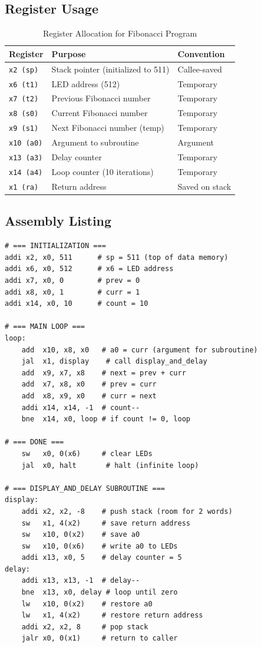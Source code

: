 \documentclass[12pt,a4paper]{article}
\begin{document}
\subsection{Register Usage}
\begin{table}[h]
\centering
\caption{Register Allocation for Fibonacci Program}
\begin{tabular}{@{}lll@{}}
\toprule
\textbf{Register} & \textbf{Purpose} & \textbf{Convention} \\
\midrule
\texttt{x2 (sp)}  & Stack pointer (initialized to 511) & Callee-saved \\
\texttt{x6 (t1)}  & LED address (512)                  & Temporary \\
\texttt{x7 (t2)}  & Previous Fibonacci number          & Temporary \\
\texttt{x8 (s0)}  & Current Fibonacci number           & Temporary \\
\texttt{x9 (s1)}  & Next Fibonacci number (temp)       & Temporary \\
\texttt{x10 (a0)} & Argument to subroutine             & Argument \\
\texttt{x13 (a3)} & Delay counter                      & Temporary \\
\texttt{x14 (a4)} & Loop counter (10 iterations)       & Temporary \\
\texttt{x1 (ra)}  & Return address                     & Saved on stack \\
\bottomrule
\end{tabular}
\end{table}

\subsection{Assembly Listing}
\begin{lstlisting}[style=asm, caption={Fibonacci Program}]
# === INITIALIZATION ===
addi x2, x0, 511      # sp = 511 (top of data memory)
addi x6, x0, 512      # x6 = LED address
addi x7, x0, 0        # prev = 0
addi x8, x0, 1        # curr = 1
addi x14, x0, 10      # count = 10

# === MAIN LOOP ===
loop:
    add  x10, x8, x0   # a0 = curr (argument for subroutine)
    jal  x1, display    # call display_and_delay
    add  x9, x7, x8    # next = prev + curr
    add  x7, x8, x0    # prev = curr
    add  x8, x9, x0    # curr = next
    addi x14, x14, -1  # count--
    bne  x14, x0, loop # if count != 0, loop

# === DONE ===
    sw   x0, 0(x6)     # clear LEDs
    jal  x0, halt       # halt (infinite loop)

# === DISPLAY_AND_DELAY SUBROUTINE ===
display:
    addi x2, x2, -8    # push stack (room for 2 words)
    sw   x1, 4(x2)     # save return address
    sw   x10, 0(x2)    # save a0
    sw   x10, 0(x6)    # write a0 to LEDs
    addi x13, x0, 5    # delay counter = 5
delay:
    addi x13, x13, -1  # delay--
    bne  x13, x0, delay # loop until zero
    lw   x10, 0(x2)    # restore a0
    lw   x1, 4(x2)     # restore return address
    addi x2, x2, 8     # pop stack
    jalr x0, 0(x1)     # return to caller
\end{lstlisting}
\end{document}
